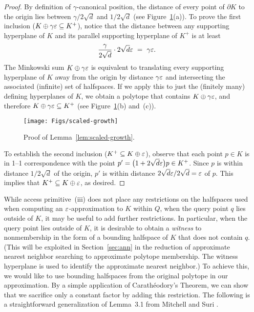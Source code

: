\documentclass[11pt]{article}   \usepackage[letterpaper,hmargin=2.1cm,vmargin=3cm]{geometry}
\begin{document}
\begin{proof}
By definition of $\gamma$-canonical position, the distance of every point of $\partial K$ to the origin lies between $\gamma/2 \sqrt{d}$ and $1/2 \sqrt{d}$ (see Figure~\ref{fig:scaled-growth}(a)). To prove the first inclusion ($K \oplus \gamma \varepsilon \subseteq K^+$), notice that the distance between any supporting hyperplane of $K$ and its parallel supporting hyperplane of $K^+$ is at least
\[
	\frac{\gamma}{2\sqrt{d}} \cdot 2 \sqrt{d} \varepsilon
		~ = ~ \gamma \varepsilon.
\]
The Minkowski sum $K \oplus \gamma \varepsilon$ is equivalent to translating every supporting hyperplane of $K$ away from the origin by distance $\gamma \varepsilon$ and intersecting the associated (infinite) set of halfspaces. If we apply this to just the (finitely many) defining hyperplanes of $K$, we obtain a polytope that contains $K \oplus \gamma \varepsilon$, and therefore $K \oplus \gamma \varepsilon \subseteq K^+$ (see Figure~\ref{fig:scaled-growth}(b) and~(c)). 

\begin{figure}[htbp]
  \centerline{\texttt{[image: Figs/scaled-growth]}}
  \caption{Proof of Lemma~\ref{lem:scaled-growth}.}
  \label{fig:scaled-growth}
\end{figure}


To establish the second inclusion ($K^+ \subseteq K \oplus \varepsilon$), observe that each point $p \in K$ is in 1--1 correspondence with the point $p' = \big(1 + 2 \sqrt{d} \varepsilon\big) p \in K^+$. Since $p$ is within distance $1/2 \sqrt{d}$ of the origin, $p'$ is within distance $2 \sqrt{d} \varepsilon/2 \sqrt{d} = \varepsilon$ of $p$. This implies that $K^+ \subseteq K \oplus \varepsilon$, as desired.
\end{proof}


While access primitive~(iii) does not place any restrictions on the halfspaces used when computing an $\varepsilon$-approximation to $K$ within $Q$, when the query point $q$ lies outside of $K$, it may be useful to add further restrictions. In particular, when the query point lies outside of $K$, it is desirable to obtain a \emph{witness} to nonmembership in the form of a bounding halfspace of $K$ that does not contain $q$. (This will be exploited in Section~\ref{sec:ann} in the reduction of approximate nearest neighbor searching to approximate polytope membership. The witness hyperplane is used to identify the approximate nearest neighbor.) To achieve this, we would like to use bounding halfspaces from the original polytope in our approximation. By a simple application of Carath\'{e}odory's Theorem, we can show that we sacrifice only a constant factor by adding this restriction. The following is a straightforward generalization of Lemma~{3.1} from Mitchell and Suri \cite{MS}. 
\end{document}
